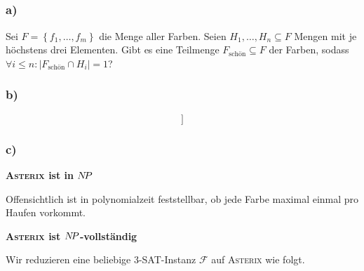 \documentclass{article}
\begin{document}
\subsection{} 

\subsubsection{a)}

Sei $F = \left\{f_1, \dots, f_m\right\}$ die Menge aller Farben. Seien $H_1,
\dots, H_n \subseteq F$ Mengen mit je höchstens drei Elementen. Gibt es eine
Teilmenge $F_{\text{schön}}\subseteq F$ der Farben, sodass $\forall i \le n:
|F_{\text{schön}} \cap H_i| = 1$?

\subsubsection{b)}

\begin{equation*}
   [[x_i \vee x_j \vee x_k]]
\end{equation*}

\subsubsection{c)}

\textbf{\textsc{Asterix} ist in $N\kern-2ptP$}
\vspace{\baselineskip}

Offensichtlich ist in polynomialzeit feststellbar, ob jede Farbe maximal einmal
pro Haufen vorkommt.

\vspace{\baselineskip}
\noindent\textbf{\textsc{Asterix} ist $N\kern-2ptP$-vollständig}
\vspace{\baselineskip}

Wir reduzieren eine beliebige \textsc{3-SAT}-Instanz $\mathcal{F}$ auf \textsc{Asterix} wie
folgt. 
\end{document}
